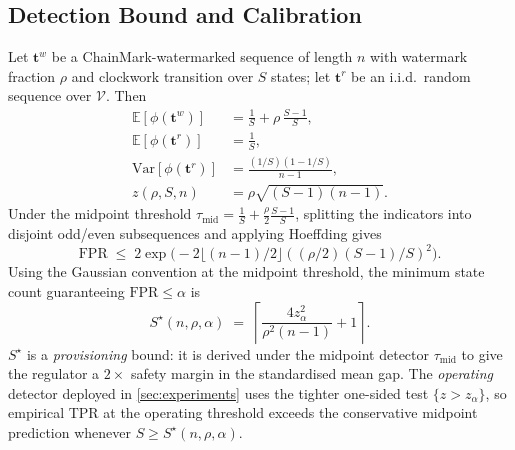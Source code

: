 \subsection{Detection Bound and Calibration}
\label{subsec:proof-detection}

\begin{theorem}
  \label{thm:detection}
  Let $\mathbf{t}^w$ be a ChainMark-watermarked sequence of length $n$
  with watermark fraction $\rho$ and clockwork transition over $S$
  states; let $\mathbf{t}^r$ be an i.i.d.\ random sequence over
  $\mathcal{V}$.  Then
  \begin{align}
    \mathbb{E}\!\left[\phi(\mathbf{t}^w)\right]
      &= \tfrac{1}{S} + \rho\, \tfrac{S-1}{S}, \\
    \mathbb{E}\!\left[\phi(\mathbf{t}^r)\right] &= \tfrac{1}{S}, \\
    \mathrm{Var}\!\left[\phi(\mathbf{t}^r)\right]
      &= \tfrac{(1/S)(1-1/S)}{n-1}, \\
    z(\rho, S, n)
      &= \rho \sqrt{(S-1)(n-1)}.
  \end{align}
  Under the midpoint threshold $\tau_{\mathrm{mid}} = \tfrac{1}{S} +
  \tfrac{\rho}{2} \tfrac{S-1}{S}$, splitting the indicators into
  disjoint odd/even subsequences and applying Hoeffding gives
  \[
    \mathrm{FPR}
      \;\leq\; 2 \exp\!\bigl(-2 \lfloor (n-1)/2 \rfloor
        ((\rho/2)(S-1)/S)^2\bigr).
  \]
  Using the Gaussian convention at the midpoint threshold, the
  minimum state count guaranteeing $\mathrm{FPR} \leq \alpha$ is
  \begin{equation}
    S^\star(n, \rho, \alpha)
      \;=\; \left\lceil \frac{4 z_\alpha^2}{\rho^2 (n-1)} + 1
        \right\rceil.
    \label{eq:calibration}
  \end{equation}
  $S^\star$ is a \emph{provisioning} bound: it is derived under the
  midpoint detector $\tau_{\mathrm{mid}}$ to give the regulator a
  $2\times$ safety margin in the standardised mean gap. The
  \emph{operating} detector deployed in
  \autoref{sec:experiments} uses the tighter one-sided test
  $\{z > z_\alpha\}$, so empirical TPR at the operating threshold
  exceeds the conservative midpoint prediction whenever
  $S \geq S^\star(n,\rho,\alpha)$.
\end{theorem}


